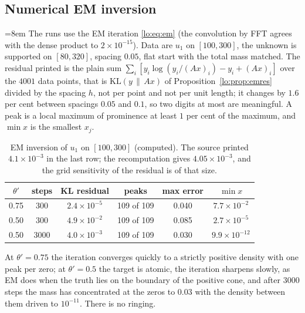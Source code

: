 \subsection{Numerical EM inversion}\label{lo:sec:emnum}

{\emergencystretch=8em The runs use the EM iteration \eqref{lo:eq:em} (the convolution by FFT agrees with the dense product to $2\times10^{-15}$). Data are $u_1$ on $[100,300]$, the unknown is supported on $[80,320]$, spacing $0.05$, flat start with the total mass matched. The residual printed is the plain sum $\sum_i[y_i\log(y_i/(Ax)_i)-y_i+(Ax)_i]$ over the $4001$ data points, that is $\mathrm{KL}(y\,\|\,Ax)$ of Proposition~\ref{lo:prop:emres} divided by the spacing $h$, not per point and not per unit length; it changes by $1.6$ per cent between spacings $0.05$ and $0.1$, so two digits at most are meaningful. A peak is a local maximum of prominence at least $1$ per cent of the maximum, and $\min x$ is the smallest $x_j$.\par}

\begin{table}[ht]
\centering
\small
\begin{tabular}{cccccc}
\toprule
$\theta'$ & steps & KL residual & peaks & max error & $\min x$\\
\midrule
0.75 & 300 & $2.4\times10^{-5}$ & 109 of 109 & 0.040 & $7.7\times10^{-2}$\\
0.50 & 300 & $4.9\times10^{-2}$ & 109 of 109 & 0.085 & $2.7\times10^{-5}$\\
0.50 & 3000 & $4.0\times10^{-3}$ & 109 of 109 & 0.030 & $9.9\times10^{-12}$\\
\bottomrule
\end{tabular}
\caption{EM inversion of $u_1$ on $[100,300]$ (computed). The source printed $4.1\times10^{-3}$ in the last row; the recomputation gives $4.05\times10^{-3}$, and the grid sensitivity of the residual is of that size.}\label{lo:tab:em}
\end{table}

At $\theta'=0.75$ the iteration converges quickly to a strictly positive density with one peak per zero; at $\theta'=0.5$ the target is atomic, the iteration sharpens slowly, as EM does when the truth lies on the boundary of the positive cone, and after $3000$ steps the mass has concentrated at the zeros to $0.03$ with the density between them driven to $10^{-11}$. There is no ringing.

